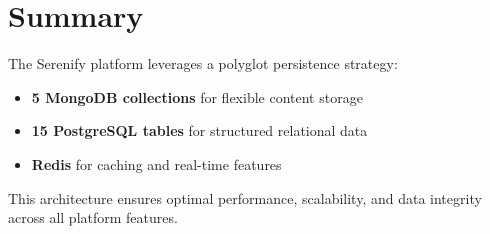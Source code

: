\documentclass[11pt,a4paper]{article}
\begin{document}
\section{Summary}

The Serenify platform leverages a polyglot persistence strategy:
\begin{itemize}
    \item \textcolor{mongogreen}{\textbf{5 MongoDB collections}} for flexible content storage
    \item \textcolor{postgresblue}{\textbf{15 PostgreSQL tables}} for structured relational data
    \item \textcolor{redisred}{\textbf{Redis}} for caching and real-time features
\end{itemize}

This architecture ensures optimal performance, scalability, and data integrity across all platform features.
\end{document}
